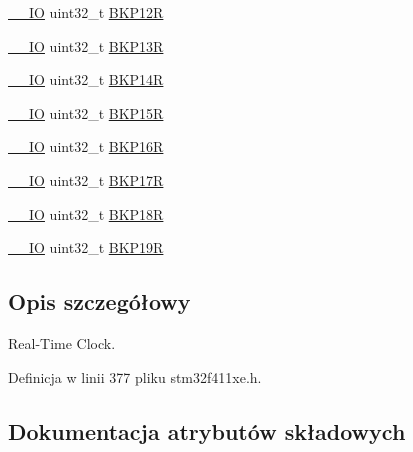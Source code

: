 \begin{DoxyCompactItemize}
\item 
\hyperlink{core__sc300_8h_aec43007d9998a0a0e01faede4133d6be}{\+\_\+\+\_\+\+IO} uint32\+\_\+t \hyperlink{struct_r_t_c___type_def_a6606b5d249f923aa15ab74b382cbaf7e}{B\+K\+P12R}
\item 
\hyperlink{core__sc300_8h_aec43007d9998a0a0e01faede4133d6be}{\+\_\+\+\_\+\+IO} uint32\+\_\+t \hyperlink{struct_r_t_c___type_def_a138903d4681455a660dccbaf3409263d}{B\+K\+P13R}
\item 
\hyperlink{core__sc300_8h_aec43007d9998a0a0e01faede4133d6be}{\+\_\+\+\_\+\+IO} uint32\+\_\+t \hyperlink{struct_r_t_c___type_def_adaae50f5c3213014fb9818eaee389676}{B\+K\+P14R}
\item 
\hyperlink{core__sc300_8h_aec43007d9998a0a0e01faede4133d6be}{\+\_\+\+\_\+\+IO} uint32\+\_\+t \hyperlink{struct_r_t_c___type_def_a797f43f9cc1858baebd1799be288dff6}{B\+K\+P15R}
\item 
\hyperlink{core__sc300_8h_aec43007d9998a0a0e01faede4133d6be}{\+\_\+\+\_\+\+IO} uint32\+\_\+t \hyperlink{struct_r_t_c___type_def_a181ad73082bde7d74010aac16bd373fc}{B\+K\+P16R}
\item 
\hyperlink{core__sc300_8h_aec43007d9998a0a0e01faede4133d6be}{\+\_\+\+\_\+\+IO} uint32\+\_\+t \hyperlink{struct_r_t_c___type_def_a90a305a8e00b357f28daef5041e5a8b1}{B\+K\+P17R}
\item 
\hyperlink{core__sc300_8h_aec43007d9998a0a0e01faede4133d6be}{\+\_\+\+\_\+\+IO} uint32\+\_\+t \hyperlink{struct_r_t_c___type_def_a171288f82cab2623832de779fb435d74}{B\+K\+P18R}
\item 
\hyperlink{core__sc300_8h_aec43007d9998a0a0e01faede4133d6be}{\+\_\+\+\_\+\+IO} uint32\+\_\+t \hyperlink{struct_r_t_c___type_def_a993f54e8feff9254f795dfd3e000fc55}{B\+K\+P19R}
\end{DoxyCompactItemize}


\subsection{Opis szczegółowy}
Real-\/\+Time Clock. 

Definicja w linii 377 pliku stm32f411xe.\+h.



\subsection{Dokumentacja atrybutów składowych}
\mbox{\label{struct_r_t_c___type_def_ad7e54d5c5a4b9fd1e26aca85b1e36c7f}} 
